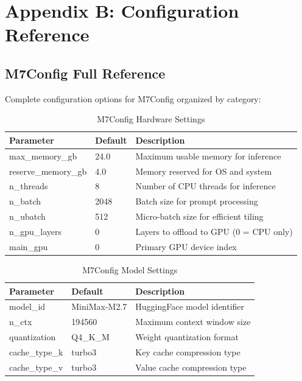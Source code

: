 \section{Appendix B: Configuration Reference}
\label{appendix:config}

\subsection{M7Config Full Reference}

Complete configuration options for M7Config organized by category:

\begin{table}[h]
\centering
\caption{M7Config Hardware Settings}
\label{tab:m7config_hardware}
\begin{tabular}{lll}
\toprule
\textbf{Parameter} & \textbf{Default} & \textbf{Description} \\
\midrule
max\_memory\_gb & 24.0 & Maximum usable memory for inference \\
reserve\_memory\_gb & 4.0 & Memory reserved for OS and system \\
n\_threads & 8 & Number of CPU threads for inference \\
n\_batch & 2048 & Batch size for prompt processing \\
n\_ubatch & 512 & Micro-batch size for efficient tiling \\
n\_gpu\_layers & 0 & Layers to offload to GPU (0 = CPU only) \\
main\_gpu & 0 & Primary GPU device index \\
\bottomrule
\end{tabular}
\end{table}

\begin{table}[h]
\centering
\caption{M7Config Model Settings}
\label{tab:m7config_model}
\begin{tabular}{lll}
\toprule
\textbf{Parameter} & \textbf{Default} & \textbf{Description} \\
\midrule
model\_id & MiniMax-M2.7 & HuggingFace model identifier \\
n\_ctx & 194560 & Maximum context window size \\
quantization & Q4\_K\_M & Weight quantization format \\
cache\_type\_k & turbo3 & Key cache compression type \\
cache\_type\_v & turbo3 & Value cache compression type \\
\bottomrule
\end{tabular}
\end{table}

